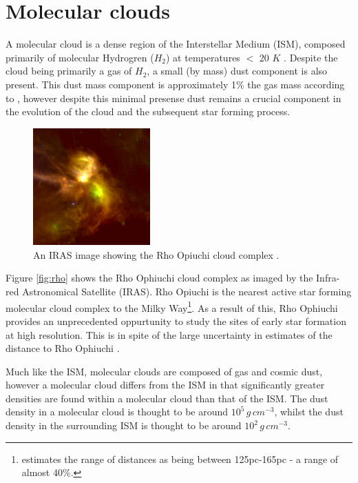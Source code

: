 \documentclass{report}
\begin{document}
\section{Molecular clouds}
A molecular cloud is a dense region of the Interstellar Medium (ISM), composed primarily of molecular Hydrogren ($H_{2}$) at temperatures $<$ 20 $K$ \parencite{dustopacity}. Despite the cloud being primarily a gas of $H_{2}$, a small (by mass) dust component is also present. This dust mass component is approximately 1\% the gas mass according to \textcite{noise}, however despite this minimal presense dust remains a crucial component in the evolution of the cloud and the subsequent star forming process.

\begin{figure}
  \begin{center}
    \includegraphics[width=0.4\textwidth]{../img/rho.jpg}
    \caption[An IRAS image showing the Rho Opiuchi cloud complex \parencite{rho}.]{An IRAS image showing the Rho Opiuchi cloud complex \parencite{rho}.}
  \end{center}
\end{figure} \label{fig:rho}

Figure \ref{fig:rho} shows the Rho Ophiuchi cloud complex as imaged by the Infra-red Astronomical Satellite (IRAS). Rho Opiuchi is the nearest active star forming molecular cloud complex to the Milky Way\footnote{\textcite{rho-dist} estimates the range of distances as being between 125pc-165pc - a range of almost 40\%.}. As a result of this, Rho Ophiuchi provides an unprecedented oppurtunity to study the sites of early star formation at high resolution. This is in spite of the large uncertainty in estimates of the distance to Rho Ophiuchi \parencite{rho-dist}.

Much like the ISM, molecular clouds are composed of gas and cosmic dust, however a molecular cloud differs from the ISM in that significantly greater densities are found within a molecular cloud than that of the ISM. The dust density in a molecular cloud is thought to be around $10^{5}\,g\,cm^{-3}$, whilst the dust density in the surrounding ISM is thought to be around $10^{2}\,g\,cm^{-3}$.
\end{document}
